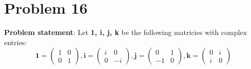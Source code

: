 \documentclass{article} %
\begin{document}
\newpage

\section*{Problem 16}


\textbf{Problem statement}: Let \textbf{1, i, j, k} be the following matricies with complex entries:
\[ \textbf{1} = \left( \begin{matrix} 1 & 0 \\ 0 & 1 \end{matrix} \right),
    \textbf{i} = \left( \begin{matrix} i & 0 \\ 0 & -i \end{matrix} \right),
    \textbf{j} = \left( \begin{matrix} 0 & 1 \\ -1 & 0 \end{matrix} \right),
    \textbf{k} = \left( \begin{matrix} 0 & i \\ i & 0 \end{matrix} \right) \]
\\
\end{document}
